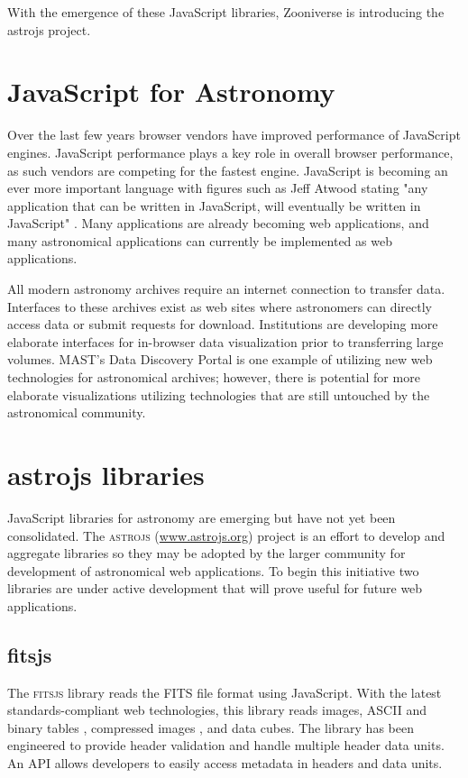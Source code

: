 With the emergence of these JavaScript libraries, Zooniverse is introducing the astrojs project.

\section{JavaScript for Astronomy}

Over the last few years browser vendors have improved performance of JavaScript engines.  JavaScript performance plays a key role in overall browser performance, as such vendors are competing for the fastest engine.  JavaScript is becoming an ever more important language with figures such as Jeff Atwood stating "any application that can be written in JavaScript, will eventually be written in JavaScript" \citep{Atwood}.  Many applications are already becoming web applications, and many astronomical applications can currently be implemented as web applications.

All modern astronomy archives require an internet connection to transfer data.  Interfaces to these archives exist as web sites where astronomers can directly access data or submit requests for download.  Institutions are developing more elaborate interfaces for in-browser data visualization prior to transferring large volumes.  MAST's Data Discovery Portal is one example of utilizing new web technologies for astronomical archives; however, there is potential for more elaborate visualizations utilizing technologies that are still untouched by the astronomical community.

\section{astrojs libraries}

JavaScript libraries for astronomy are emerging but have not yet been consolidated.  The \textsc{astrojs} (\url{www.astrojs.org}) project is an effort to develop and aggregate libraries so they may be adopted by the larger community for development of astronomical web applications.  To begin this initiative two libraries are under active development that will prove useful for future web applications.

\subsection{fitsjs}

The \textsc{fitsjs} library reads the FITS file format \citep{2010A&A...524A..42P} using JavaScript.  With the latest standards-compliant web technologies, this library reads images, ASCII and binary tables \citep{1995A&AS..113..159C}, compressed images \citep{2012arXiv1201.1336W}, and data cubes.  The library has been engineered to provide header validation and handle multiple header data units.  An API allows developers to easily access metadata in headers and data units.

